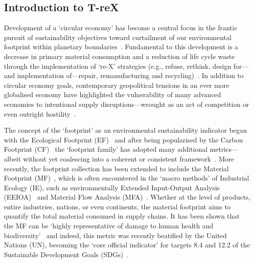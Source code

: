 \subsection{Introduction to T-reX}\label{sec:intro-trex}

Development of a `circular economy' has become a central focus in the frantic pursuit of sustainability objectives toward curtailment of our environmental footprint within planetary boundaries~\citep{eu2019greendeal, eu2020circ,nl2023ceplan,nl2016ceplan,pardo2018ce,ellenmacarthur2015ce}. Fundamental to this development is a decrease in primary material consumption and a reduction of life cycle waste through the implementation of `re-X' strategies (e.g., refuse, rethink, design for---and implementation of---repair, remanufacturing and recycling)~\citep{reike2018rex, eu2022ecodesign, eu2022repair, eu2015reman}. In addition to circular economy goals, contemporary geopolitical tensions in an ever more globalised economy have highlighted the vulnerability of many advanced economies to intentional supply disruptions---wrought as an act of competition or even outright hostility~\citep{jrc2023supplychain,hartley2024cepolitics,berry2023crm}.

The concept of the `footprint' as an environmental sustainability indicator began with the Ecological Footprint (EF)~\citep{wackernagel1994ecologicalfootprint} and after being popularised by the Carbon Footprint (CF)~\citep{cucek2015environmentalfootprints} the `footprint family' has adopted many additional metrics---albeit without yet coalescing into a coherent or consistent framework~\citep{giampietro2014footprintstonowhere, vanham2019footprints,ridoutt2013footprints}. More recently, the footprint collection has been extended to include the Material Footprint (MF)~\citep{weidmann2013materialfootprint}, which is often encountered in the `macro methods' of Industrial Ecology (IE), such as environmentally Extended Input-Output Analysis (EEIOA)~\citep{lenzen2022materialfootprint} and Material Flow Analysis (MFA)~\citep{schaffartzik2013mfafootprint}. Whether at the level of products, entire industries, nations, or even continents, the material footprint aims to quantify the total material consumed in supply chains. It has been shown that the MF can be `highly representative of damage to human health and biodiversity'~\citep{steinmann2017resourcefootprints} and indeed, this metric was recently beatified by the United Nations (UN), becoming the `core official indicator' for targets 8.4 and 12.2 of the Sustainable Development Goals (SDGs)~\citep{lenzen2022materialfootprint}.

